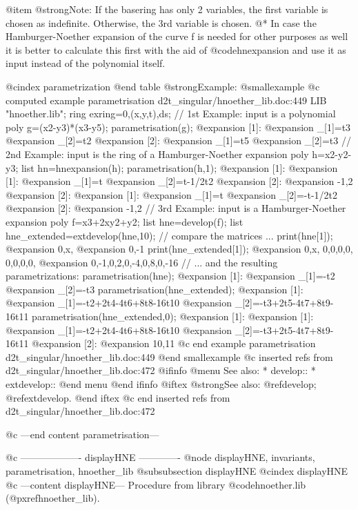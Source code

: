@item @strong{Note:}
If the basering has only 2 variables, the first variable is chosen
as indefinite. Otherwise, the 3rd variable is chosen. @*
In case the Hamburger-Noether expansion of the curve f is needed
for other purposes as well it is better to calculate this first
with the aid of @code{hnexpansion} and use it as input instead of
the polynomial itself.

@cindex parametrization
@end table
@strong{Example:}
@smallexample
@c computed example parametrisation d2t_singular/hnoether_lib.doc:449 
LIB "hnoether.lib";
ring exring=0,(x,y,t),ds;
// 1st Example: input is a polynomial
poly g=(x2-y3)*(x3-y5);
parametrisation(g);
@expansion{} [1]:
@expansion{}    _[1]=t3
@expansion{}    _[2]=t2
@expansion{} [2]:
@expansion{}    _[1]=t5
@expansion{}    _[2]=t3
// 2nd Example: input is the ring of a Hamburger-Noether expansion
poly h=x2-y2-y3;
list hn=hnexpansion(h);
parametrisation(h,1);
@expansion{} [1]:
@expansion{}    [1]:
@expansion{}       _[1]=t
@expansion{}       _[2]=t-1/2t2
@expansion{}    [2]:
@expansion{}       -1,2
@expansion{} [2]:
@expansion{}    [1]:
@expansion{}       _[1]=t
@expansion{}       _[2]=-t-1/2t2
@expansion{}    [2]:
@expansion{}       -1,2
// 3rd Example: input is a Hamburger-Noether expansion
poly f=x3+2xy2+y2;
list hne=develop(f);
list hne_extended=extdevelop(hne,10);
//   compare the matrices ...
print(hne[1]);
@expansion{} 0,x,
@expansion{} 0,-1
print(hne_extended[1]);
@expansion{} 0,x, 0,0,0,0, 0,0,0,0, 
@expansion{} 0,-1,0,2,0,-4,0,8,0,-16
// ... and the resulting parametrizations:
parametrisation(hne);
@expansion{} [1]:
@expansion{}    _[1]=-t2
@expansion{}    _[2]=-t3
parametrisation(hne_extended);
@expansion{} [1]:
@expansion{}    _[1]=-t2+2t4-4t6+8t8-16t10
@expansion{}    _[2]=-t3+2t5-4t7+8t9-16t11
parametrisation(hne_extended,0);
@expansion{} [1]:
@expansion{}    [1]:
@expansion{}       _[1]=-t2+2t4-4t6+8t8-16t10
@expansion{}       _[2]=-t3+2t5-4t7+8t9-16t11
@expansion{}    [2]:
@expansion{}       10,11
@c end example parametrisation d2t_singular/hnoether_lib.doc:449
@end smallexample
@c inserted refs from d2t_singular/hnoether_lib.doc:472
@ifinfo
@menu
See also:
* develop::
* extdevelop::
@end menu
@end ifinfo
@iftex
@strong{See also:}
@ref{develop};
@ref{extdevelop}.
@end iftex
@c end inserted refs from d2t_singular/hnoether_lib.doc:472

@c ---end content parametrisation---

@c ------------------- displayHNE -------------
@node displayHNE, invariants, parametrisation, hnoether_lib
@subsubsection displayHNE
@cindex displayHNE
@c ---content displayHNE---
Procedure from library @code{hnoether.lib} (@pxref{hnoether_lib}).

